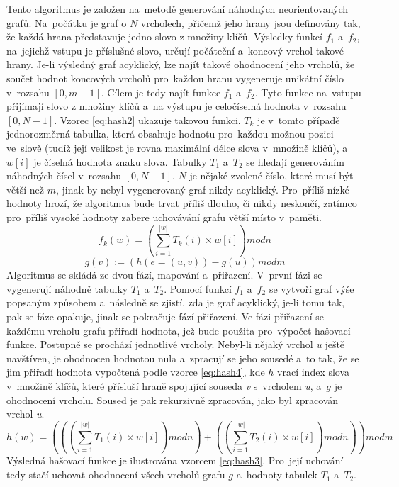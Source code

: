 \documentclass[11pt,twoside,a4paper]{book}
\begin{document}
Tento algoritmus je založen na~metodě generování náhodných neorientovaných grafů. Na~počátku je graf o $N$ vrcholech, přičemž jeho hrany jsou definovány tak, že každá hrana představuje jedno slovo z množiny klíčů. Výsledky funkcí $f_1$ a~$f_2$, na~jejichž vstupu je příslušné slovo, určují počáteční a~koncový vrchol takové hrany. Je-li výsledný graf acyklický, lze najít takové ohodnocení jeho vrcholů, že součet hodnot koncových vrcholů pro~každou hranu vygeneruje unikátní číslo v~rozsahu $[0,m-1]$. Cílem je tedy najít funkce $f_1$ a~$f_2$. Tyto funkce na~vstupu přijímají slovo z množiny klíčů a~na výstupu je celočíselná hodnota v~rozsahu $[0,N-1]$. Vzorec \ref{eq:hash2} ukazuje takovou funkci. $T_k$ je v~tomto případě jednorozměrná tabulka, která obsahuje hodnotu pro~každou možnou pozici ve~slově (tudíž její velikost je rovna maximální délce slova v~množině klíčů), a~$w[i]$ je číselná hodnota znaku slova. Tabulky $T_1$ a~$T_2$ se hledají generováním náhodných čísel v~rozsahu $[0,N-1]$. $N$ je nějaké zvolené číslo, které musí být větší než $m$, jinak by nebyl vygenerovaný graf nikdy acyklický. Pro~příliš nízké hodnoty hrozí, že algoritmus bude trvat příliš dlouho, či nikdy neskončí, zatímco pro~příliš vysoké hodnoty zabere uchovávání grafu větší místo v~paměti.
\begin{equation} \label{eq:hash2}
f_k(w)=(\sum\limits_{i=1}^{|w|} T_k(i) \times w[i]) mod n
\end{equation}
\begin{equation} \label{eq:hash4}
g(v) := (h(e=(u,v))-g(u)) mod m
\end{equation}
Algoritmus se skládá ze dvou fází, mapování a~přiřazení. V~první fázi se vygenerují náhodně tabulky $T_1$ a~$T_2$. Pomocí funkcí $f_1$ a~$f_2$ se vytvoří graf výše popsaným způsobem a~následně se zjistí, zda je graf acyklický, je-li tomu tak, pak se fáze opakuje, jinak se pokračuje fází přiřazení. 
 Ve fázi přiřazení se každému vrcholu grafu přiřadí hodnota, jež bude použita pro~výpočet hašovací funkce. Postupně se prochází jednotlivé vrcholy. Nebyl-li nějaký vrchol \textit{u} ještě navštíven, je ohodnocen hodnotou nula a~zpracují se jeho sousedé a~to tak, že se jim přiřadí hodnota vypočtená podle vzorce \ref{eq:hash4}, kde $h$ vrací index slova v~množině klíčů, které přísluší hraně spojující souseda \textit{v} s~vrcholem \textit{u}, a~$g$ je ohodnocení vrcholu. Soused je pak rekurzivně zpracován, jako byl zpracován vrchol \textit{u}.
\begin{equation} \label{eq:hash3}
h(w) = (((\sum\limits_{i=1}^{|w|} T_1(i) \times w[i]) mod n) + ((\sum\limits_{i=1}^{|w|} T_2(i) \times w[i]) mod n)) mod m
\end{equation}
Výsledná hašovací funkce je ilustrována vzorcem \ref{eq:hash3}.  Pro~její uchování tedy stačí uchovat ohodnocení všech vrcholů grafu $g$ a~hodnoty tabulek $T_1$ a~$T_2$.
\end{document}
